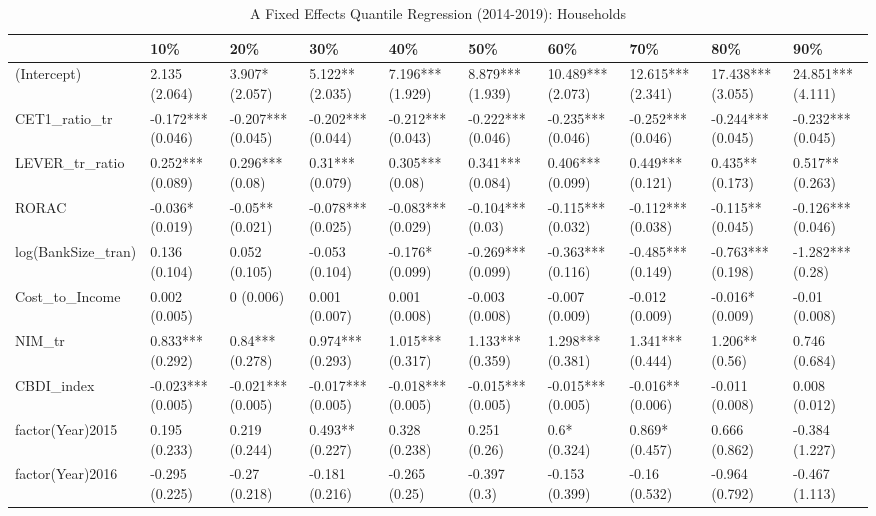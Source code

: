 \begin{table}[ht]
\centering
\caption{A Fixed Effects Quantile Regression (2014-2019): Households} 
\begingroup\small
\begin{tabular}{llllllllll}
  \toprule
 & 10\% & 20\% & 30\% & 40\% & 50\% & 60\% & 70\% & 80\% & 90\% \\ 
  \midrule
(Intercept) & 2.135 (2.064) & 3.907* (2.057) & 5.122** (2.035) & 7.196*** (1.929) & 8.879*** (1.939) & 10.489*** (2.073) & 12.615*** (2.341) & 17.438*** (3.055) & 24.851*** (4.111) \\ 
  CET1\_ratio\_tr & -0.172*** (0.046) & -0.207*** (0.045) & -0.202*** (0.044) & -0.212*** (0.043) & -0.222*** (0.046) & -0.235*** (0.046) & -0.252*** (0.046) & -0.244*** (0.045) & -0.232*** (0.045) \\ 
  LEVER\_tr\_ratio & 0.252*** (0.089) & 0.296*** (0.08) & 0.31*** (0.079) & 0.305*** (0.08) & 0.341*** (0.084) & 0.406*** (0.099) & 0.449*** (0.121) & 0.435** (0.173) & 0.517** (0.263) \\ 
  RORAC & -0.036* (0.019) & -0.05** (0.021) & -0.078*** (0.025) & -0.083*** (0.029) & -0.104*** (0.03) & -0.115*** (0.032) & -0.112*** (0.038) & -0.115** (0.045) & -0.126*** (0.046) \\ 
  log(BankSize\_tran) & 0.136 (0.104) & 0.052 (0.105) & -0.053 (0.104) & -0.176* (0.099) & -0.269*** (0.099) & -0.363*** (0.116) & -0.485*** (0.149) & -0.763*** (0.198) & -1.282*** (0.28) \\ 
  Cost\_to\_Income & 0.002 (0.005) & 0 (0.006) & 0.001 (0.007) & 0.001 (0.008) & -0.003 (0.008) & -0.007 (0.009) & -0.012 (0.009) & -0.016* (0.009) & -0.01 (0.008) \\ 
  NIM\_tr & 0.833*** (0.292) & 0.84*** (0.278) & 0.974*** (0.293) & 1.015*** (0.317) & 1.133*** (0.359) & 1.298*** (0.381) & 1.341*** (0.444) & 1.206** (0.56) & 0.746 (0.684) \\ 
  CBDI\_index & -0.023*** (0.005) & -0.021*** (0.005) & -0.017*** (0.005) & -0.018*** (0.005) & -0.015*** (0.005) & -0.015*** (0.005) & -0.016** (0.006) & -0.011 (0.008) & 0.008 (0.012) \\ 
  factor(Year)2015 & 0.195 (0.233) & 0.219 (0.244) & 0.493** (0.227) & 0.328 (0.238) & 0.251 (0.26) & 0.6* (0.324) & 0.869* (0.457) & 0.666 (0.862) & -0.384 (1.227) \\ 
  factor(Year)2016 & -0.295 (0.225) & -0.27 (0.218) & -0.181 (0.216) & -0.265 (0.25) & -0.397 (0.3) & -0.153 (0.399) & -0.16 (0.532) & -0.964 (0.792) & -0.467 (1.113) \\ 

\end{tabular}
\end{table}

